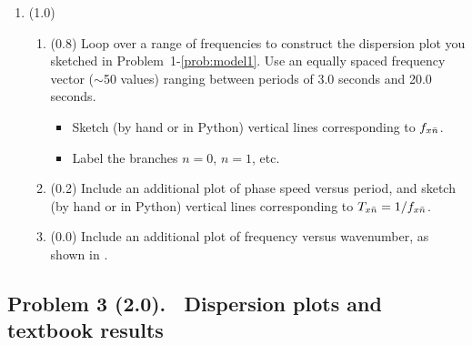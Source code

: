 \documentclass[11pt,titlepage,fleqn]{article}
\begin{document}
\begin{enumerate}

\item (1.0)
\begin{enumerate}
\item (0.8) Loop over a range of frequencies to construct the dispersion plot you sketched in Problem~1-\ref{prob:model1}. Use an equally spaced frequency vector ($\sim$50 values) ranging between periods of 3.0 seconds and 20.0 seconds.
%
\begin{itemize}
\item Sketch (by hand or in Python) vertical lines corresponding to ${f}_{x\bar{n}}$.
\item Label the branches $n=0$, $n=1$, etc.
\end{itemize}

\item (0.2) Include an additional plot of phase speed versus period, and sketch (by hand or in Python) vertical lines corresponding to ${T}_{x\bar{n}} = 1/{f}_{x\bar{n}}$.

\item (0.0) Include an additional plot of frequency versus wavenumber, as shown in .
\end{enumerate}

\end{enumerate}


\subsection*{Problem 3 (2.0). \ptag\ Dispersion plots and textbook results}
\end{document}
